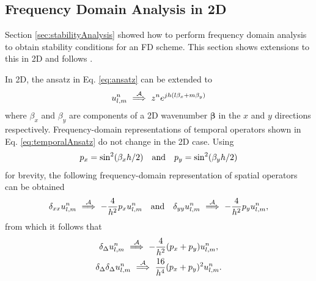 \subsection{Frequency Domain Analysis in 2D}\label{sec:stability2Dwave}
Section \ref{sec:stabilityAnalysis} showed how to perform frequency domain analysis to obtain stability conditions for an FD scheme. This section shows extensions to this in 2D and follows \cite[Ch. 10]{theBible}.

In 2D, the ansatz in Eq. \eqref{eq:ansatz} can be extended to 
\begin{equation}
    u_{l,m}^n \ \overset{\mathcal{A}}{\Longrightarrow}\  z^n e^{jh(l\beta_x + m\beta_y)}
\end{equation}
where $\beta_x$ and $\beta_y$ are components of a 2D wavenumber $\boldsymbol{\beta}$ in the $x$ and $y$ directions respectively. Frequency-domain representations of temporal operators shown in Eq. \eqref{eq:temporalAnsatz} do not change in the 2D case. Using 
\begin{equation}\label{eq:pxpy}
    p_x = \sin^2(\beta_x h/2) \quad \text{and} \quad p_y = \sin^2(\beta_y h/2)
\end{equation}
for brevity, the following frequency-domain representation of spatial operators can be obtained
\begin{equation}
    \delta_{xx} u_{l,m}^n \ \overset{\mathcal{A}}{\Longrightarrow}\  -\frac{4}{h^2}p_x 
    u_{l,m}^n \quad \text{and} \quad \delta_{yy} u_{l,m}^n \ \overset{\mathcal{A}}{\Longrightarrow}\  -\frac{4}{h^2}p_y 
    u_{l,m}^n,
\end{equation}
from which it follows that
\begin{gather}
    \delta_{\Delta}u_{l,m}^n \ \overset{\mathcal{A}}{\Longrightarrow}\  -\frac{4}{h^2}(p_x + p_y)u_{l,m}^n,\label{eq:laplacianAnsatz}\\
    \delta_{\Delta}\delta_{\Delta}u_{l,m}^n \ \overset{\mathcal{A}}{\Longrightarrow}\  \frac{16}{h^4}(p_x + p_y)^2u_{l,m}^n.\label{eq:biharmonicAnsatz}
\end{gather}

